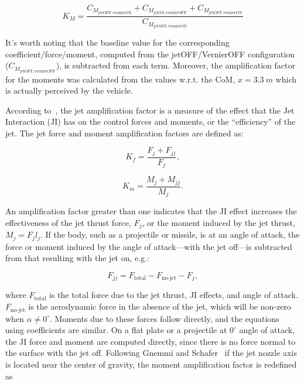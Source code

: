 \documentclass[12pt]{article}
\begin{document}
\begin{equation}
    K_M = \frac{C_{M_{\text{jetOFF,vernierON}}} + C_{M_{\text{jetON,vernierOFF}}} + C_{M_{\text{jetOFF,vernierON}}}}{C_{M_{\text{jetOFF,vernierON}}}}
    \label{eq:my-KM}
\end{equation}

It's worth noting that the baseline value for the corresponding coefficient/force/moment, computed from the jetOFF/VernierOFF configuration ($C_{M_{\text{jetOFF,vernierOFF}}}$), is subtracted from each term. Moreover, the amplification factor for the moments was calculated from the values w.r.t. the CoM, $x=3.3~m$ which is actually perceived by the vehicle.

According to~\cite{despirito2015turbulence}, the jet amplification factor is a measure of the effect that the Jet Interaction (JI) has on the control forces and moments, or the ``efficiency'' of the jet. The jet force and moment amplification factors are defined as:

\begin{equation}
    K_f = \frac{F_j + F_{jj}}{F_j},
\end{equation}

\begin{equation}
    K_m = \frac{M_j + M_{jj}}{M_j}.
\end{equation}

An amplification factor greater than one indicates that the JI effect increases the effectiveness of the jet thrust force, $F_j$, or the moment induced by the jet thrust, $M_j = F_j l_j$. If the body, such as a projectile or missile, is at an angle of attack, the force or moment induced by the angle of attack—with the jet off—is subtracted from that resulting with the jet on, e.g.:

\begin{equation}
    F_{jj} = F_{\text{total}} - F_{\text{no-jet}} - F_j,
\end{equation}

where $F_{\text{total}}$ is the total force due to the jet thrust, JI effects, and angle of attack. $F_{\text{no-jet}}$ is the aerodynamic force in the absence of the jet, which will be non-zero when $\alpha \neq 0^\circ$. Moments due to these forces follow directly, and the equations using coefficients are similar. On a flat plate or a projectile at $0^\circ$ angle of attack, the JI force and moment are computed directly, since there is no force normal to the surface with the jet off. Following Gnemmi and Schafer~\cite{gnemmi2008computational} if the jet nozzle axis is located near the center of gravity, the moment amplification factor is redefined as
\end{document}

